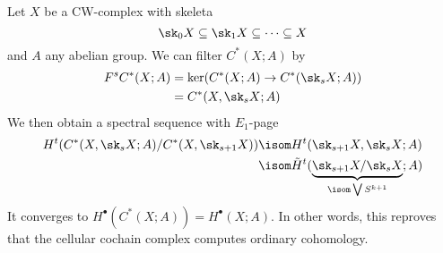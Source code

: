 \begin{example}\label{epl:cwfiltration}
	Let $X$ be a CW-complex with skeleta
	\begin{equation*}
		\sk_0 X \subseteq \sk_1 X \subseteq \cdots \subseteq X
	\end{equation*}
	and $A$ any abelian group.
	We can filter $C^*(X; A)$ by
	\begin{align*}
		F^s C^*(X; A) &= \ker(C^*(X; A) \to C^*(\sk_s X; A)) \\
					  &= C^*(X, \sk_s X; A)
	\end{align*}
	We then obtain a spectral sequence with $E_1$-page
	\begin{align*}
		H^t(C^*(X, \sk_s X; A) / C^*(X, \sk_{s + 1} X)) &\isom H^t(\sk_{s + 1} X, \sk_s X; A) \\
													  &\isom \tilde{H}^t(\underbrace{\sk_{s + 1} X / \sk_s X}_{\isom \bigvee S^{k + 1}}; A)
	\end{align*}
	It converges to $H^\bullet(C^*(X; A)) = H^\bullet(X; A)$.
	In other words, this reproves that the cellular cochain complex computes ordinary cohomology.
\end{example}
